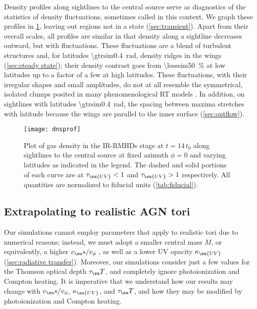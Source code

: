 \documentclass[twocolumn]{article}
\newcommand*\irrmhd{\ac{IR}\protect\nobreakdash-\acp{RMHD}}
\begin{document}
Density profiles along sightlines to the central source serve as diagnostics of
the statistics of density fluctuations, sometimes called 
in this context. We graph these profiles in \cref{fig:density}, leaving out
regions not in a  state (\cref{sec:transient}). Apart from
their overall scales, all profiles are similar in that density along a
sightline decreases outward, but with fluctuations. These fluctuations are a
blend of turbulent structures and, for latitudes \SI{\gtrsim0.4}{\radian},
density ridges in the wings (\cref{sec:steady state}); their density contrast
goes from \SI{\lesssim50}{\percent} at low latitudes up to a factor of a few at
high latitudes. These fluctuations, with their irregular shapes and small
amplitudes, do not at all resemble the symmetrical, isolated clumps posited in
many phenomenological \ac{RT} models \citep[e.g.,][]{2002ApJ...570L...9N,
2006A&A...452..459H, 2008ApJ...685..147N, 2008A&A...482...67S,
2012ApJ...751...27H, 2012ApJ...759...36R, 2012MNRAS.420.2756S}. In addition, on
sightlines with latitudes \SI{\gtrsim0.4}{\radian}, the spacing between maxima
stretches with latitude because the wings are parallel to the inner surface
(\cref{sec:outflow}).

\begin{figure}
\texttt{[image: dnsprof]}
\caption{Plot of gas density in the \irrmhd{} stage at $t=14\,t_0$ along
sightlines to the central source at fixed azimuth $\phi=0$ and varying
latitudes as indicated in the legend. The dashed and solid portions of each
curve are at $\tau_\su{UV}<1$ and $\tau_\su{UV}>1$ respectively. All quantities
are normalized to fiducial units (\cref{tab:fiducial}).}
\label{fig:density}
\end{figure}

\subsection{Extrapolating to realistic \texorpdfstring{\acs*{AGN}}{AGN} tori}
\label{sec:extrapolation}

Our simulations cannot employ parameters that apply to realistic tori due to
numerical reasons; instead, we must adopt a smaller central mass $M$, or
equivalently, a higher $c_\su s/v_\phi$ , as
well as a lower \ac{UV} opacity $\kappa_\su{UV}$ (\cref{sec:radiative
transfer}). Moreover, our simulations consider just a few values for the
Thomson optical depth $\tau_\su T$, and completely ignore photoionization and
Compton heating. It is imperative that we understand how our results may change
with $c_\su s/v_\phi$, $\kappa_\su{UV}$, and $\tau_\su T$, and how they may be
modified by photoionization and Compton heating.
\end{document}

